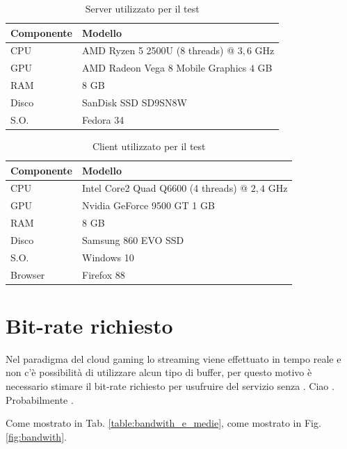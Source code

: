 \begin{table}[H]
	\centering
	\begin{tabular}{||l l||}
		\hline
		Componente & Modello \\
		\hline\hline				
		\hline
		CPU & AMD Ryzen 5 2500U (8 threads) @ $3,6$ GHz \\
		\hline
		GPU & AMD Radeon Vega 8 Mobile Graphics $4$ GB \\
		\hline
		RAM & 8 GB \\
		\hline
		Disco & SanDisk SSD SD9SN8W \\
		\hline
		S.O. & Fedora 34 \\
		\hline
	\end{tabular}

	\caption{Server utilizzato per il test}
	\label{table:ServerUsato}
\end{table}


\begin{table}[H]
	\centering
	\begin{tabular}{||l l||}
		\hline
		Componente & Modello \\
		\hline\hline				
		\hline
		CPU & Intel Core2 Quad Q6600 (4 threads) @ $2,4$ GHz \\
		\hline
		GPU & Nvidia GeForce 9500 GT 1 GB\\
		\hline
		RAM & 8 GB \\
		\hline
		Disco & Samsung 860 EVO SSD \\
		\hline
		S.O. & Windows 10 \\
		\hline
		Browser & Firefox 88 \\
		\hline
	\end{tabular}

	\caption{Client utilizzato per il test}
	\label{table:ClientUsato}
\end{table}


\section{Bit-rate richiesto}
Nel paradigma del cloud gaming lo streaming viene effettuato in tempo reale e non c'è possibilità di utilizzare alcun tipo di buffer, per questo motivo è necessario stimare il bit-rate richiesto per usufruire del servizio senza \parencite{Network_Analysis_of_the_Sony_Remote_Play_System}. Ciao \parencite{StreamingMobileCloudGamingVideoOverTCPWithAdaptiveSourceFECCoding}. Probabilmente \parencite{ChenKuanTa2014OtQo}.

Come mostrato in Tab. \ref{table:bandwith_e_medie}, come mostrato in Fig. \ref{fig:bandwith}.

